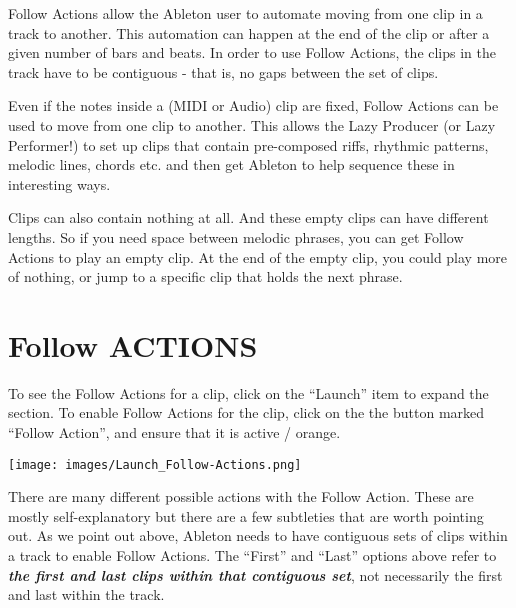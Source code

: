 \documentclass[
  12pt,
  letterpaper,
  oneside,
  open=any]{scrbook}
\begin{document}
\begin{tcolorbox}[enhanced jigsaw, colback=white, rightrule=.15mm, toprule=.15mm, arc=.35mm, opacitybacktitle=0.6, coltitle=black, leftrule=.75mm, bottomtitle=1mm, toptitle=1mm, left=2mm, bottomrule=.15mm, titlerule=0mm, colbacktitle=quarto-callout-tip-color!10!white, colframe=quarto-callout-tip-color-frame, title=\textcolor{quarto-callout-tip-color}{\faLightbulb}\hspace{0.5em}{Key idea}, breakable, opacityback=0]

Follow Actions allow the Ableton user to automate moving from one clip
in a track to another. This automation can happen at the end of the clip
or after a given number of bars and beats. In order to use Follow
Actions, the clips in the track have to be contiguous - that is, no gaps
between the set of clips.

Even if the notes inside a (MIDI or Audio) clip are fixed, Follow
Actions can be used to move from one clip to another. This allows the
Lazy Producer (or Lazy Performer!) to set up clips that contain
pre-composed riffs, rhythmic patterns, melodic lines, chords etc. and
then get Ableton to help sequence these in interesting ways.

Clips can also contain nothing at all. And these empty clips can have
different lengths. So if you need space between melodic phrases, you can
get Follow Actions to play an empty clip. At the end of the empty clip,
you could play more of nothing, or jump to a specific clip that holds
the next phrase.

\end{tcolorbox}

\section{Follow ACTIONS}\label{follow-actions}

To see the Follow Actions for a clip, click on the ``Launch'' item to
expand the section. To enable Follow Actions for the clip, click on the
the button marked ``Follow Action'', and ensure that it is active /
orange.

\texttt{[image: images/Launch\_Follow-Actions.png]}

There are many different possible actions with the Follow Action. These
are mostly self-explanatory but there are a few subtleties that are
worth pointing out. As we point out above, Ableton needs to have
contiguous sets of clips within a track to enable Follow Actions. The
``First'' and ``Last'' options above refer to \textbf{\emph{the first
and last clips within that contiguous set}}, not necessarily the first
and last within the track.
\end{document}
